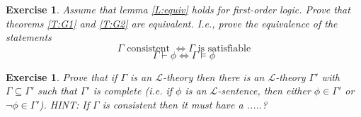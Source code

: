 \documentclass{article}
\theoremstyle{plain}
\newtheorem{Q}[theorem]{Exercise}{\bfseries}{\upshape}
\newcommand{\sL}{\mathscr{L}}
\begin{document}
\begin{Q}
Assume that lemma \ref{L:equiv} holds for first-order logic. Prove that theorems \ref{T:G1} and \ref{T:G2} are equivalent. I.e., prove the equivalence of the statements
\[\tag{$\dagger$} \text{$\Gamma$ consistent $\iff\Gamma$ is satisfiable}\]
\[\tag{$\ddagger$} \Gamma\vdash \phi\iff\Gamma\models\phi\]
\end{Q}
\begin{comment}
\textbf{Solution:}
This is similar to exercise \ref{godel_equiv}.
\begin{itemize}
\item[$\dagger\implies\ddagger$:] \begin{align*}
\Gamma\vdash \phi &\iff \Gamma\cup\{\neg\phi\}\vdash \bot\\
&\iff \Gamma\cup\{\neg\phi\}\models \bot\\
&\iff \Gamma\models \phi
\end{align*}
\item[$\ddagger\implies\dagger$:] 
\begin{align*}
\Gamma\vdash \bot &\iff \Gamma\setminus\{\phi\} \cup\{\phi\} \vdash \bot \\
&\iff \Gamma\setminus\{\phi\}\vdash \neg\phi \\
&\iff \Gamma\setminus\{\phi\}\models \neg\phi \\
&\iff\Gamma\models \bot
\end{align*}
\end{itemize}
\end{comment}


\begin{Q}
Prove that if $\Gamma$ is an $\sL$-theory then there is an $\sL$-theory $\Gamma'$ with $\Gamma\subseteq \Gamma'$ such that $\Gamma'$ is \emph{complete} (i.e. if $\phi$ is an $\sL$-sentence, then either $\phi\in\Gamma'$ or $\neg\phi\in\Gamma'$). HINT: If $\Gamma$ is consistent then it must have a .....?
\end{Q}
\begin{comment}
\textbf{Solution:}
An $\sL$-theory is a satisfiable set of $\sL$-sentences. Since $\Gamma$ is satisfiable, it must have a model. Let $A$ be a model for $\Gamma$, and let 
\[\Gamma'=\{\phi:\phi\text{ is an }\sL\text{-sentence and }A\models \phi\}.\] 
Then $\Gamma\subseteq \Gamma'$, because $A\models \Gamma$, and $\Gamma'$ is complete because every $\sL$-sentence is either true or false in $A$.
\end{comment}
\end{document}
